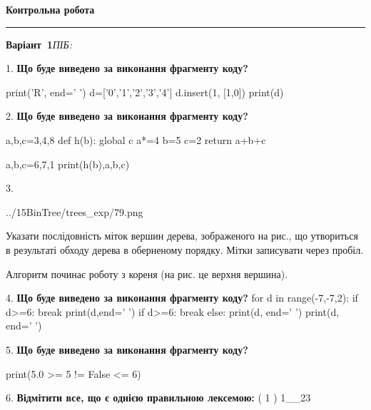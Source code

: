 \documentclass[11pt]{article}
\begin{document}
{\centering\Large\bfseries Контрольна робота\par}
\medskip
\noindent\rule{\linewidth}{0.5pt}
\smallskip
\noindent\textbf{Варіант \No\,1}\hfill \textit{ПІБ:}\,\underline{\hspace{60mm}}
\vspace{4mm}

1. \textbf{Що буде виведено за виконання фрагменту коду?}

print('R', end=' ')
d=['0','1','2','3','4']
d.insert(1, [1,0])
print(d)

\par\vspace{5mm}

2. \textbf{Що буде виведено за виконання фрагменту коду?}

a,b,c=3,4,8
def h(b):
global c    a*=4
    b=5
    c=2
    return a+b+c

a,b,c=6,7,1
print(h(b),a,b,c)
\par\vspace{5mm}

3. 

\begin{center}
	{../15BinTree/trees_exp/79.png}
\end{center}
Указати послідовність міток вершин дерева, зображеного на рис., що утвориться в результаті обходу дерева в оберненому порядку. Мітки записувати через пробіл.\par Алгоритм починає роботу з кореня (на рис. це верхня вершина).
\par\vspace{5mm}

4. \textbf{Що буде виведено за виконання фрагменту коду?}
for d in range(-7,-7,2):
    if d>=6:
        break
        print(d,end=' ')
    if d>=6:
        break
else:
    print(d, end=' ')
print(d, end=' ')
\par\vspace{5mm}

5. \textbf{Що буде виведено за виконання фрагменту коду?}

print(5.0 >= 5 != False <= 6)
\par\vspace{5mm}

6. %
\textbf{Відмітити все, що є однією правильною лексемою:}
( 1 ) 1__23
\end{document}
